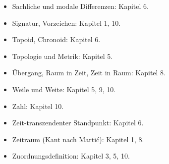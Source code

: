 \begin{itemize}
\item Sachliche und modale Differenzen: Kapitel 6.
\item Signatur, Vorzeichen: Kapitel 1, 10.
\item Topoid, Chronoid: Kapitel 6.
\item Topologie und Metrik: Kapitel 5.
\item Übergang, Raum in Zeit, Zeit in Raum: Kapitel 8.
\item Weile und Weite: Kapitel 5, 9, 10.
\item Zahl: Kapitel 10.
\item Zeit-transzendenter Standpunkt: Kapitel 6.
\item Zeitraum (Kant nach Martić): Kapitel 1, 8.
\item Zuordnungsdefinition: Kapitel 3, 5, 10.
\end{itemize}
